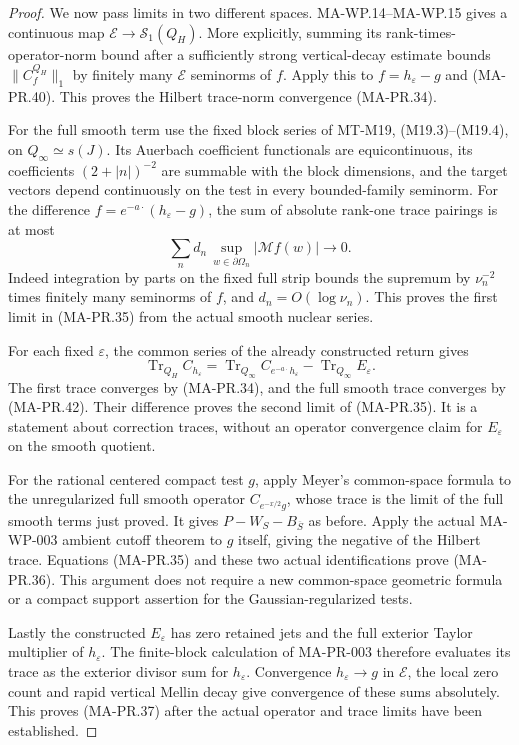 \begin{proof}
We now pass limits in two different spaces.
MA-WP.14--MA-WP.15 gives a continuous map
$\mathcal E\to\mathcal S_1(Q_H)$.
More explicitly, summing its rank-times-operator-norm
bound after a sufficiently strong vertical-decay
estimate bounds
$\|C_f^{Q_H}\|_1$ by finitely many
$\mathcal E$ seminorms of $f$.
Apply this to $f=h_\varepsilon-g$ and (MA-PR.40).
This proves the Hilbert trace-norm convergence
(MA-PR.34).

For the full smooth term use the fixed block
series of MT-M19, (M19.3)--(M19.4), on
$Q_\infty\simeq s(J)$.
Its Auerbach coefficient functionals are
equicontinuous, its coefficients
$(2+|n|)^{-2}$ are summable with the block
dimensions, and the target vectors depend
continuously on the test in every bounded-family
seminorm.
For the difference $f=e^{-a\cdot}(h_\varepsilon-g)$,
the sum of absolute rank-one trace pairings is
at most
\[
       \sum_n d_n\,
          \sup_{w\in\partial\Omega_n}|\mathcal Mf(w)|
                \longrightarrow0 .
\tag{MA-PR.42}
\]
Indeed integration by parts on the fixed full
strip bounds the supremum by $\nu_n^{-2}$
times finitely many seminorms of $f$, and
$d_n=O(\log\nu_n)$.
This proves the first limit in (MA-PR.35)
from the actual smooth nuclear series.

For each fixed $\varepsilon$, the common series
of the already constructed return gives
\[
 \operatorname{Tr}_{Q_H}C_{h_\varepsilon}
    =\operatorname{Tr}_{Q_\infty}
            C_{e^{-a\cdot}h_\varepsilon}
                   -\operatorname{Tr}_{Q_\infty}E_\varepsilon .
\tag{MA-PR.43}
\]
The first trace converges by (MA-PR.34), and
the full smooth trace converges by (MA-PR.42).
Their difference proves the second limit of
(MA-PR.35).  It is a statement about correction
traces, without an operator convergence claim
for $E_\varepsilon$ on the smooth quotient.

For the rational centered compact test $g$,
apply Meyer's common-space formula to the
unregularized full smooth operator
$C_{e^{-x/2}g}$, whose trace is the limit of the
full smooth terms just proved.
It gives $P-W_S-B_{\overline S}$ as before.
Apply the actual MA-WP-003 ambient cutoff
theorem to $g$ itself, giving the negative
of the Hilbert trace.
Equations (MA-PR.35) and these two actual
identifications prove (MA-PR.36).
This argument does not require a new
common-space geometric formula or a compact
support assertion for the Gaussian-regularized
tests.

Lastly the constructed $E_\varepsilon$ has
zero retained jets and the full exterior
Taylor multiplier of $h_\varepsilon$.
The finite-block calculation of MA-PR-003
therefore evaluates its trace as the
exterior divisor sum for $h_\varepsilon$.
Convergence $h_\varepsilon\to g$ in
$\mathcal E$, the local zero count and
rapid vertical Mellin decay give convergence
of these sums absolutely.
This proves (MA-PR.37) after the actual
operator and trace limits have been established.
\end{proof}

